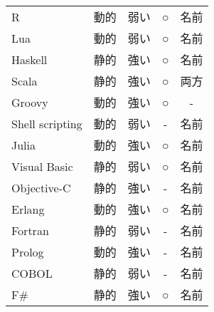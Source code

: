 \documentclass[a4paper]{ltjsreport}
\begin{document}
\begin{center}
\begin{tabular}{|l|c|c|c|c|}
    R               & {\color{red}動的}  & {\color{blue}弱い} & {○}             & 名前                          \\
    Lua             & {\color{red}動的}  & {\color{blue}弱い} & {○}             & 名前                          \\
    Haskell         & {\color{blue}静的} & {\color{red}強い}  & {○}             & 名前                          \\
    Scala           & {\color{blue}静的} & {\color{red}強い}  & {○}             & 両方                          \\
    Groovy          & {\color{red}動的}  & {\color{red}強い}  & {○}             & -                             \\
    Shell scripting & {\color{red}動的}  & {\color{blue}弱い} & {-}             & 名前                          \\
    Julia           & {\color{red}動的}  & {\color{red}強い}  & {○}             & 名前                          \\
    Visual Basic    & {\color{blue}静的} & {\color{blue}弱い} & {○}             & 名前                          \\
    Objective-C     & {\color{blue}静的} & {\color{red}強い}  & {-}             & 名前                          \\
    Erlang          & {\color{red}動的}  & {\color{red}強い}  & {○}             & 名前                          \\
    Fortran         & {\color{blue}静的} & {\color{blue}弱い} & {-}             & 名前                          \\
    Prolog          & {\color{red}動的}  & {\color{red}強い}  & {-}             & 名前                          \\
    COBOL           & {\color{blue}静的} & {\color{blue}弱い} & {-}             & 名前                          \\
    F\#             & {\color{blue}静的} & {\color{red}強い}  & {○}             & 名前                          \\
    \hline
  \end{tabular}
\end{center}
\end{document}
